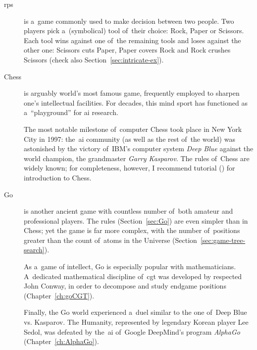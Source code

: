 \newcommand{\figurewidthratio}{0.3}
\begin{description}
  \item [\acrfull{rps}] is a~game commonly used to make decision between two people.
    Two players pick a~(symbolical) tool of~their choice: Rock, Paper or Scissors.
    Each tool wins against one of~the remaining tools and loses against the other one: Scissors cuts Paper, Paper covers Rock and Rock crushes Scissors (check also Section~\ref{sec:intricate-ex}).

  \item [Chess] is arguably world's most famous game, frequently employed to sharpen one's intellectual facilities.
    For decades, this mind sport has functioned as a~``playground'' for \acrfull{ai} research.

    The most notable milestone of~computer Chess took place in New York City in 1997:
    the~\acrshort{ai} community (as well as the rest of~the world) was astonished by the victory of~IBM's computer system \emph{Deep Blue} against the world champion, the grandmaster \emph{Garry Kasparov}.
    The rules of~Chess are widely known; for completeness, however, I recommend tutorial (\cite{Karpov1997disney}) for introduction to Chess.

  \item [Go] is another ancient game with countless number of~both amateur and professional players.
    The rules (Section~\ref{sec:Go}) are even simpler than in Chess; yet the game is far more complex, with the number of~positions greater than the count of~atoms in the Universe (Section~\ref{sec:game-tree-search}).

    As a~game of intellect, Go is especially popular with mathematicians.
    A~dedicated mathematical discipline of~\acrfull{cgt} was developed by respected John Conway, in order to decompose and study endgame positions (Chapter~\ref{ch:goCGT}).

    Finally, the Go world experienced a~duel similar to the one of~Deep Blue vs. Kasparov.
    The Humanity, represented by legendary Korean player Lee Sedol, was defeated by the~\acrshort{ai} of~Google DeepMind's program \emph{AlphaGo} (Chapter~\ref{ch:AlphaGo}).


\end{description}
